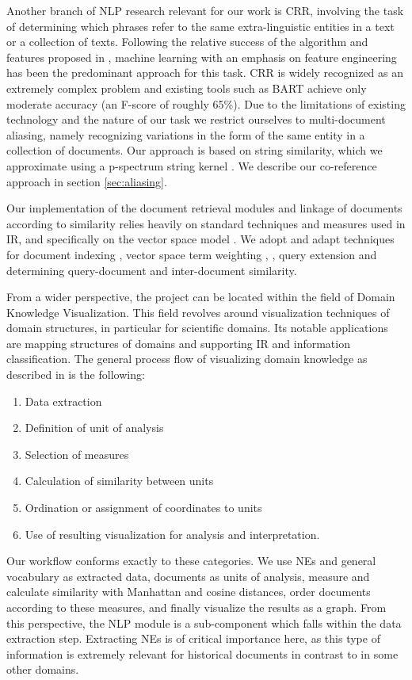 Another branch of NLP research relevant for our work is CRR, involving the task of determining which phrases refer to the same extra-linguistic entities in a text or a collection of texts.
Following the relative success of the algorithm and features proposed in \cite {soon2001coreference}, machine learning 
with an emphasis on feature engineering has been the predominant approach for this task. CRR is widely 
recognized as an extremely complex problem and existing tools such as BART \cite{bart} achieve only moderate accuracy (an F-score of roughly 65\%). Due to the limitations of existing technology and the nature of our task we restrict ourselves to multi-document aliasing, namely recognizing variations in the form of the same entity in a collection of documents. Our approach is based on string similarity, 
which we approximate using a p-spectrum string kernel \cite{kernels2004}. We describe our co-reference approach in section \ref{sec:aliasing}.

Our implementation of the document retrieval modules and linkage of documents according to similarity relies heavily on standard techniques 
and measures used in IR, and specifically on the vector space model \cite{ir2008}. We adopt and adapt techniques for 
document indexing \cite{indexing1999}, vector space term weighting \cite{jones2004}, \cite{salton1971}, query extension and determining query-document and 
inter-document similarity. 

From a wider perspective, the project can be located within the field of Domain Knowledge Visualization. This field revolves around visualization
techniques of domain structures, in particular for scientific domains. Its notable applications are mapping structures of domains and supporting
IR and information classification.
The general process flow of visualizing domain knowledge as described in
\cite{visualizing2003} is the following: 
\begin{enumerate}
\item Data extraction 
\item Definition of unit of analysis 
\item Selection of measures 
\item Calculation of similarity between units 
\item Ordination or assignment of coordinates to units 
\item Use of resulting visualization for analysis and interpretation.
\end{enumerate}
Our workflow conforms exactly to these categories. We use NEs and general vocabulary as extracted data, documents as units of analysis, measure and calculate similarity with Manhattan and cosine distances, order documents according to these measures, and finally visualize the results as a graph.
From this perspective, the NLP module is a sub-component which falls within the data extraction step. Extracting NEs is of critical importance
here, as this type of information is extremely relevant for historical documents in contrast to in some other domains.  


